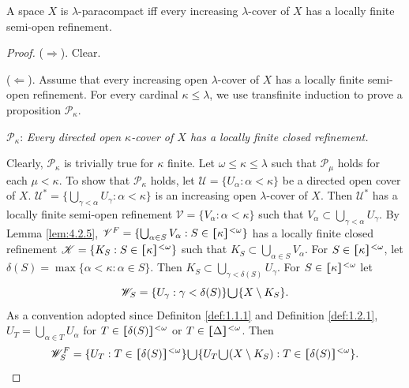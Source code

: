 \documentclass[ch4.tex]{subfiles}
\begin{document}
{\theorem{} \label{th:4.2.6}
A space $X$ is $\lambda$-paracompact iff every increasing
$\lambda$-cover of $X$ has
a locally finite semi-open refinement.
}

\begin{proof}
($\Rightarrow$). Clear.

($\Leftarrow$). Assume that every increasing open $\lambda$-cover of $X$ has
a locally finite semi-open refinement. For every cardinal $\kappa \le \lambda$,
we use transfinite induction to prove a proposition  $\mathcal{P}_\kappa$.

$\mathcal{P}_\kappa$: \textit{Every directed open
$\kappa$-cover of $X$ has a locally finite closed refinement.}

\noindent Clearly, $\mathcal{P}_\kappa$ is trivially true for $\kappa$ finite. Let
$\omega \le \kappa \le \lambda$ such that $\mathcal{P}_\mu$ holds for each $\mu < \kappa$. To show
that $\mathcal{P}_\kappa$ holds, let
$\mathscr{U} = \{U_\alpha: \alpha < \kappa\}$ be a directed open
cover of $X$. 
$\mathscr{U}^* = \{\bigcup_{\gamma < \alpha} U_\gamma: \alpha < \kappa\}$ is an increasing open
$\lambda$-cover of $X$. Then $\mathscr{U}^*$ has
a locally finite semi-open refinement
$\mathscr{V} = \{V_\alpha: \alpha < \kappa\}$ such that
$V_\alpha \subset \bigcup_{\gamma < \alpha} U_\gamma$. By Lemma \ref{lem:4.2.5},
$\mathscr{V}^{F} = \{\bigcup_{\alpha \in S} V_\alpha: S \in \hstretch{1.8}{[}\kappa\hstretch{1.8}{]}^{<\omega}\}$ has
a locally finite closed refinement $\mathscr{K} = \{K_S: S \in \hstretch{1.8}{[}\kappa\hstretch{1.8}{]}^{<\omega}\}$ 
such that
$K_S \subset \bigcup_{\alpha \in S} V_\alpha$. For $S \in \hstretch{1.8}{[}\kappa\hstretch{1.8}{]}^{<\omega}$, let
$\delta(S) = \max \{\alpha < \kappa: \alpha\in S\}$. Then 
$K_S \subset \bigcup_{\gamma < \delta(S)} U_\gamma$. 
For $S \in \hstretch{1.8}{[}\kappa\hstretch{1.8}{]}^{<\omega}$ let
$$\mathscr{W}_S = \{U_\gamma: \gamma < \delta(S)\} 
\raisebox{-2pt}{\scalebox{1.5}{$\cup$}} \{X\setminus K_S\}.$$ 
\noindent As a convention adopted since Definiton \ref{def:1.1.1} and Definition \ref{def:1.2.1},
$U_T  = \bigcup_{\alpha\in T}U_\alpha$ for $T\in \hstretch{1.8}{[}\delta(S)\hstretch{1.8}{]}^{<\omega}$ 
or $T\in \hstretch{1.8}{[}\Delta\hstretch{1.8}{]}^{<\omega}$.
Then
\begin{gather}
\mathscr{W}_S^F = \{U_T: T \in \hstretch{1.8}{[}\delta(S)\hstretch{1.8}{]}^{<\omega}\} 
\raisebox{-2pt}{\scalebox{1.5}{$\cup$}} 
\{U_T \raisebox{-2pt}{\scalebox{1.5}{$\cup$}} (X \setminus K_S): 
T \in \hstretch{1.8}{[}\delta(S)\hstretch{1.8}{]}^{<\omega}\}. \label{eq:4.2.6.1}

\end{gather}
\end{proof}
\end{document}
